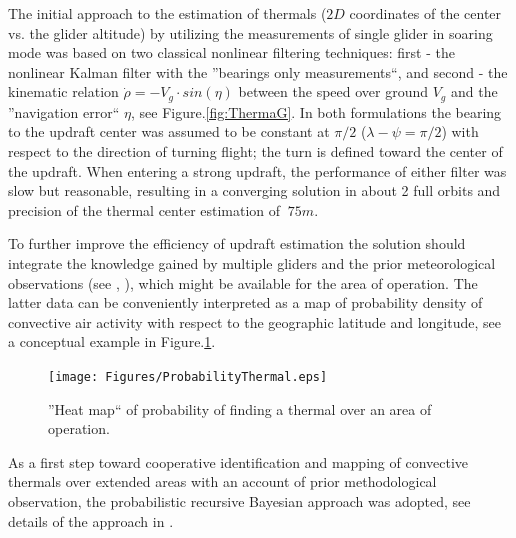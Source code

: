 \documentclass[letterpaper, 10 pt, conference]{ieeeconf}  %
\begin{document}
The initial approach to the estimation of thermals ($2D$ coordinates of the center vs. the glider altitude) by utilizing the measurements of single glider in soaring mode was based on two classical nonlinear filtering techniques: first - the nonlinear Kalman filter with the ''bearings only measurements``, and second - the kinematic relation $\dot{\rho}=-V_g\cdot sin(\eta)$ between the speed over ground $V_g$ and the ''navigation error`` $\eta$, see Figure.\ref{fig:ThermaG}. In both formulations the bearing to the updraft center was assumed to be constant at $\pi/2$ ($\lambda-\psi=\pi/2$) with respect to the direction of turning flight; the turn is defined toward the center of the updraft. When entering a strong updraft, the performance of either filter was slow but reasonable, resulting in a converging solution in about 2 full orbits and precision of the thermal center estimation of $~75m$.

To further improve the efficiency of updraft estimation the solution should integrate the knowledge gained by multiple gliders and the prior meteorological observations (see \cite{Pennycuick:1998},
\cite{Hindman:2007}), which might be available for the area of operation. The latter data can be conveniently interpreted as a map of probability density of convective air activity with respect to the geographic latitude and longitude, see a conceptual example in Figure.\ref{fig:HeatMap}.
\begin{figure}[thpb]
  \centering
  \texttt{[image: Figures/ProbabilityThermal.eps]}
  \caption{''Heat map`` of probability of finding a thermal over an area of operation.}
  \label{fig:HeatMap}
\end{figure}
As a first step toward cooperative identification and mapping of convective thermals over extended areas with an account of prior methodological observation, the probabilistic recursive Bayesian approach was adopted, see details of the approach in \cite{Bergman:1999}.
\end{document}
